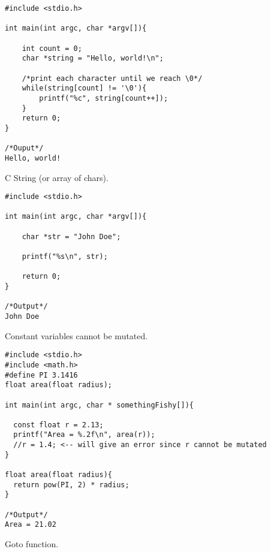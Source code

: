 \documentclass[10pt, a4paper, twocolumn]{article} %
\begin{document}
\begin{lstlisting}
#include <stdio.h>

int main(int argc, char *argv[]){

	int count = 0;
	char *string = "Hello, world!\n";

	/*print each character until we reach \0*/
	while(string[count] != '\0'){
		printf("%c", string[count++]);
	}
	return 0;
}

/*Ouput*/
Hello, world!
\end{lstlisting}

C String (or array of chars).

\begin{lstlisting}
#include <stdio.h>

int main(int argc, char *argv[]){

	char *str = "John Doe";

	printf("%s\n", str);

	return 0;
}

/*Output*/
John Doe
\end{lstlisting}

Constant variables cannot be mutated.

\begin{lstlisting}
#include <stdio.h>
#include <math.h>
#define PI 3.1416
float area(float radius);

int main(int argc, char * somethingFishy[]){

  const float r = 2.13;
  printf("Area = %.2f\n", area(r));
  //r = 1.4; <-- will give an error since r cannot be mutated
}

float area(float radius){
  return pow(PI, 2) * radius;
}

/*Output*/
Area = 21.02
\end{lstlisting}

Goto function.
\end{document}
